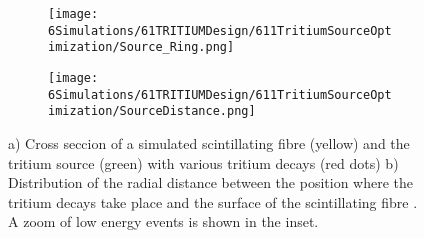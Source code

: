 \begin{figure}
\centering
    \begin{subfigure}[b]{0.5\textwidth}
    \centering
    \texttt{[image: 6Simulations/61TRITIUMDesign/611TritiumSourceOptimization/Source\_Ring.png]}  
    \caption{\label{subfig:TransversalCutTritiumSource}}
    \end{subfigure}
    \hfill
    \begin{subfigure}[b]{0.5\textwidth}
    \centering
    \texttt{[image: 6Simulations/61TRITIUMDesign/611TritiumSourceOptimization/SourceDistance.png]}  
    \caption{\label{subfig:DistanceDistributionTritiumSourceFiber}}
    \end{subfigure}
 \caption{a) Cross seccion of a simulated scintillating fibre (yellow) and the tritium source (green) with various tritium decays (red dots) b) Distribution of the radial distance between the position where the tritium decays take place and the surface of the scintillating fibre \cite{SimulationPaperCarlos}. A zoom of low energy events is shown in the inset.}
 \label{fig:TritiumSourceSimulated}
\end{figure}	

